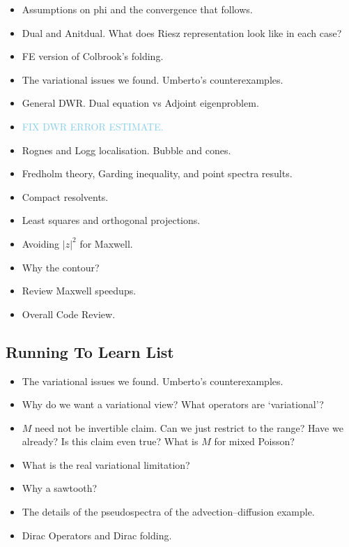 \documentclass[12pt,a4paper]{article}
\newcommand{\skyblue}[1]{\textcolor{SkyBlue}{#1}}
\begin{document}
\begin{itemize}
    \item Assumptions on phi and the convergence that follows. 
    \item Dual and Anitdual. What does Riesz representation look like in each case?
    \item FE version of Colbrook's folding.
    \item The variational issues we found. Umberto's counterexamples. 
    \item General DWR. Dual equation vs Adjoint eigenproblem.
    \item \skyblue{FIX DWR ERROR ESTIMATE.}
    \item Rognes and Logg localisation. Bubble and cones. 
    \item Fredholm theory, Garding inequality, and point spectra results. 
    \item Compact resolvents.
    \item Least squares and orthogonal projections.
    \item Avoiding $|z|^2$ for Maxwell. 
    \item Why the contour?
    \item Review Maxwell speedups.
    \item Overall Code Review.
    
\end{itemize}


\subsection{Running To Learn List}

\begin{itemize}
    \item The variational issues we found. Umberto's counterexamples. 
        \item Why do we want a variational view? What operators are `variational'?
    \item $M$ need not be invertible claim. Can we just restrict to the range? Have we already? Is this claim even true? What is $M$ for mixed Poisson? 
    \item What is the real variational limitation? 
    \item Why a sawtooth?
    \item The details of the pseudospectra of the advection--diffusion example. 
    \item Dirac Operators and Dirac folding.
    
\end{itemize}
\end{document}

